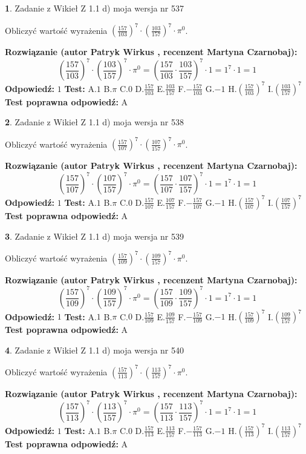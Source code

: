\documentclass[12pt, a4paper]{article}
\theoremstyle{definition} %
\newtheorem{zad}{}
\newcommand{\zadStart}[1]{\begin{zad}#1\newline}
\newcommand{\zadStop}{\end{zad}}
\newcommand{\rozwStart}[2]{\noindent \textbf{Rozwiązanie (autor #1 , recenzent #2): }\newline}
\newcommand{\rozwStop}{\newline}
\newcommand{\odpStart}{\noindent \textbf{Odpowiedź:}\newline}
\newcommand{\odpStop}{\newline}
\newcommand{\testStart}{\noindent \textbf{Test:}\newline}
\newcommand{\testStop}{\newline}
\newcommand{\kluczStart}{\noindent \textbf{Test poprawna odpowiedź:}\newline}
\newcommand{\kluczStop}{\newline}
\begin{document}
\zadStart{Zadanie z Wikieł Z 1.1 d) moja wersja nr 537}

Obliczyć wartość wyrażenia $(\frac{157}{103})^{7} \cdot (\frac{103}{157})^{7} \cdot \pi^{0}$.
\zadStop
\rozwStart{Patryk Wirkus}{Martyna Czarnobaj}
$$(\frac{157}{103})^{7} \cdot (\frac{103}{157})^{7} \cdot \pi^{0} = (\frac{157}{103} \cdot \frac{103}{157})^{7} \cdot 1 = 1^{7} \cdot 1 = 1$$
\rozwStop
\odpStart
$1$
\odpStop
\testStart
A.$1$ B.$\pi$ C.$0$ D.$\frac{157}{103}$ E.$\frac{103}{157}$
F.$-\frac{157}{103}$ G.$-1$
H.$(\frac{157}{103})^{7}$
I.$(\frac{103}{157})^{7}$
\testStop
\kluczStart
A
\kluczStop



\zadStart{Zadanie z Wikieł Z 1.1 d) moja wersja nr 538}

Obliczyć wartość wyrażenia $(\frac{157}{107})^{7} \cdot (\frac{107}{157})^{7} \cdot \pi^{0}$.
\zadStop
\rozwStart{Patryk Wirkus}{Martyna Czarnobaj}
$$(\frac{157}{107})^{7} \cdot (\frac{107}{157})^{7} \cdot \pi^{0} = (\frac{157}{107} \cdot \frac{107}{157})^{7} \cdot 1 = 1^{7} \cdot 1 = 1$$
\rozwStop
\odpStart
$1$
\odpStop
\testStart
A.$1$ B.$\pi$ C.$0$ D.$\frac{157}{107}$ E.$\frac{107}{157}$
F.$-\frac{157}{107}$ G.$-1$
H.$(\frac{157}{107})^{7}$
I.$(\frac{107}{157})^{7}$
\testStop
\kluczStart
A
\kluczStop



\zadStart{Zadanie z Wikieł Z 1.1 d) moja wersja nr 539}

Obliczyć wartość wyrażenia $(\frac{157}{109})^{7} \cdot (\frac{109}{157})^{7} \cdot \pi^{0}$.
\zadStop
\rozwStart{Patryk Wirkus}{Martyna Czarnobaj}
$$(\frac{157}{109})^{7} \cdot (\frac{109}{157})^{7} \cdot \pi^{0} = (\frac{157}{109} \cdot \frac{109}{157})^{7} \cdot 1 = 1^{7} \cdot 1 = 1$$
\rozwStop
\odpStart
$1$
\odpStop
\testStart
A.$1$ B.$\pi$ C.$0$ D.$\frac{157}{109}$ E.$\frac{109}{157}$
F.$-\frac{157}{109}$ G.$-1$
H.$(\frac{157}{109})^{7}$
I.$(\frac{109}{157})^{7}$
\testStop
\kluczStart
A
\kluczStop



\zadStart{Zadanie z Wikieł Z 1.1 d) moja wersja nr 540}

Obliczyć wartość wyrażenia $(\frac{157}{113})^{7} \cdot (\frac{113}{157})^{7} \cdot \pi^{0}$.
\zadStop
\rozwStart{Patryk Wirkus}{Martyna Czarnobaj}
$$(\frac{157}{113})^{7} \cdot (\frac{113}{157})^{7} \cdot \pi^{0} = (\frac{157}{113} \cdot \frac{113}{157})^{7} \cdot 1 = 1^{7} \cdot 1 = 1$$
\rozwStop
\odpStart
$1$
\odpStop
\testStart
A.$1$ B.$\pi$ C.$0$ D.$\frac{157}{113}$ E.$\frac{113}{157}$
F.$-\frac{157}{113}$ G.$-1$
H.$(\frac{157}{113})^{7}$
I.$(\frac{113}{157})^{7}$
\testStop
\kluczStart
A
\kluczStop
\end{document}
